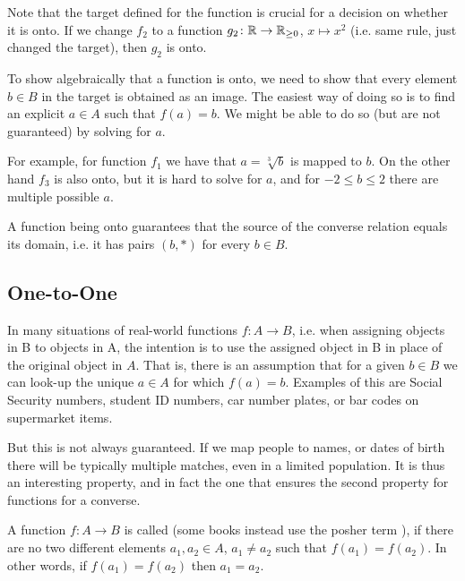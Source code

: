 Note that the target defined for the function is crucial for a decision on
whether it is onto. If we change $f_2$ to a function $g_2\colon{\mathbb R}\to{\mathbb R}_{\ge
0}$, $x\mapsto x^2$ (i.e. same rule, just changed the target), then $g_2$ is
onto.
\medskip

To show algebraically that a function is onto, we need to show that every
element $b\in B$ in the target is obtained as an image. The easiest way of
doing so is to find an explicit $a\in A$ such that $f(a)=b$. We might be
able to do so (but are not guaranteed) by solving for $a$.

For example, for function $f_1$ we have that $a=\sqrt[3]{b}$ is mapped to
$b$. On the other hand $f_3$ is also onto, but it is hard to solve for $a$,
and for $-2\le b\le 2$ there are multiple possible $a$.
\smallskip

A function being onto guarantees that the source of the converse relation
equals its domain, i.e. it has pairs
$(b,*)$ for every $b\in B$.

\subsection{One-to-One}

In many situations of real-world functions $f\colon A\to B$, i.e. when
assigning objects in B to objects in A, the
intention is to use the assigned object in B in place of the original object in $A$.
That is, there is an assumption that for a given $b\in B$ we can look-up the unique
$a\in A$ for which $f(a)=b$. Examples of this are Social Security numbers, student ID
numbers, car number plates,
or bar codes on supermarket items.

But this is not always guaranteed. If we map people to names, or dates of birth there
will be typically multiple matches, even in a limited population. It is thus an
interesting property, and in fact the one that ensures the second property for functions
for a converse.

\begin{defn}
A function $f\colon A\to B$ is called  (some books instead use the posher
term ), if there are no two different elements $a_1,a_2\in A$,
$a_1\not=a_2$ such that $f(a_1)=f(a_2)$. In other words, if $f(a_1)=f(a_2)$ then
$a_1=a_2$.
\end{defn}

